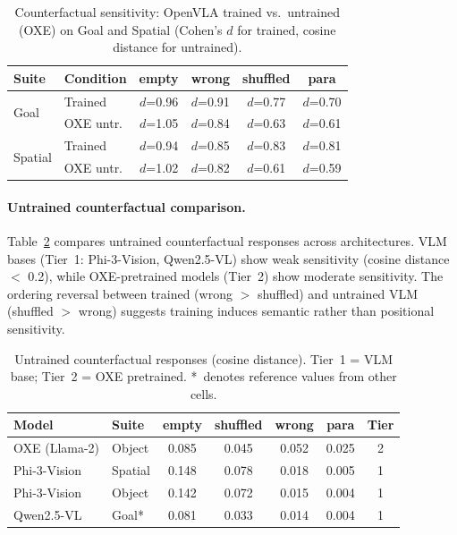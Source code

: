 \documentclass[letterpaper]{article}
\begin{document}
\begin{table}[t]
\centering
\caption{Counterfactual sensitivity: OpenVLA trained vs.\ untrained (OXE) on Goal and Spatial (Cohen's $d$ for trained, cosine distance for untrained).}
\label{tab:cf-trained}
\small
\begin{tabular}{llcccc}
\toprule
Suite & Condition & empty & wrong & shuffled & para \\
\midrule
\multirow{2}{*}{Goal}    & Trained   & $d$=0.96 & $d$=0.91 & $d$=0.77 & $d$=0.70 \\
                          & OXE untr. & $d$=1.05 & $d$=0.84 & $d$=0.63 & $d$=0.61 \\
\midrule
\multirow{2}{*}{Spatial}  & Trained   & $d$=0.94 & $d$=0.85 & $d$=0.83 & $d$=0.81 \\
                          & OXE untr. & $d$=1.02 & $d$=0.82 & $d$=0.61 & $d$=0.59 \\
\bottomrule
\end{tabular}
\end{table}

\paragraph{Untrained counterfactual comparison.}
Table~\ref{tab:cf-untrained} compares untrained counterfactual responses across architectures.
VLM bases (Tier~1: Phi-3-Vision, Qwen2.5-VL) show weak sensitivity (cosine distance $<$ 0.2), while OXE-pretrained models (Tier~2) show moderate sensitivity.
The ordering reversal between trained (wrong $>$ shuffled) and untrained VLM (shuffled $>$ wrong) suggests training induces semantic rather than positional sensitivity.

\begin{table}[t]
\centering
\caption{Untrained counterfactual responses (cosine distance). Tier~1 = VLM base; Tier~2 = OXE pretrained. *~denotes reference values from other cells.}
\label{tab:cf-untrained}
\small
\begin{tabular}{llccccc}
\toprule
Model & Suite & empty & shuffled & wrong & para & Tier \\
\midrule
OXE (Llama-2)   & Object  & 0.085 & 0.045 & 0.052 & 0.025 & 2 \\
Phi-3-Vision     & Spatial & 0.148 & 0.078 & 0.018 & 0.005 & 1 \\
Phi-3-Vision     & Object  & 0.142 & 0.072 & 0.015 & 0.004 & 1 \\
Qwen2.5-VL       & Goal*   & 0.081 & 0.033 & 0.014 & 0.004 & 1 \\
\bottomrule
\end{tabular}
\end{table}
\end{document}

